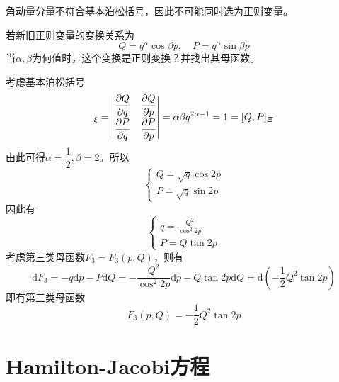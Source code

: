 角动量分量不符合基本泊松括号，因此不可能同时选为正则变量。

\begin{example}
若新旧正则变量的变换关系为
\begin{equation*}
	Q = q^\alpha \cos \beta p,\quad P = q^\alpha \sin \beta p
\end{equation*}
当$\alpha,\beta$为何值时，这个变换是正则变换？并找出其母函数。
\end{example}
\begin{solution}
考虑基本泊松括号
\begin{equation*}
	[Q,P]_\xi = \begin{vmatrix} \dfrac{\pl Q}{\pl q} & \dfrac{\pl Q}{\pl p} \\[1.5ex] \dfrac{\pl P}{\pl q} & \dfrac{\pl P}{\pl p} \end{vmatrix} = \alpha \beta q^{2\alpha-1} = 1 = [Q,P]_{\mathnormal{\Xi}}
\end{equation*}
由此可得$\alpha=\dfrac12,\beta = 2$。所以
\begin{equation*}
	\begin{cases}
		\displaystyle Q = \sqrt{q} \cos 2p \\
		\displaystyle P = \sqrt{q} \sin 2p
	\end{cases}
\end{equation*}
因此有
\begin{equation*}
	\begin{cases}
		\displaystyle q = \frac{Q^2}{\cos^2 2p} \\
		\displaystyle P = Q\tan 2p
	\end{cases}
\end{equation*}
考虑第三类母函数$F_3 = F_3(p,Q)$，则有
\begin{equation*}
	\mathrm{d} F_3 = -q\mathrm{d} p - P\mathrm{d} Q = -\frac{Q^2}{\cos^2 2p} \mathrm{d} p - Q\tan 2p \mathrm{d}Q = \mathrm{d} \left(-\frac12 Q^2 \tan 2p\right)
\end{equation*}
即有第三类母函数
\begin{equation*}
	F_3(p,Q) = -\frac12 Q^2 \tan 2p
\end{equation*}
\end{solution}

\section{Hamilton-Jacobi方程}\label{chapter10:section-Hamilton-Jacobi方程}

